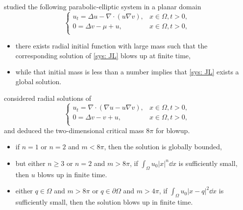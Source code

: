 \begin{frame}
 studied the following parabolic-elliptic system in a planar domain   
\begin{equation}\label{sys: JL}
\begin{cases}\tag{JL}
u_t = \Delta u - \nabla\cdot(u\nabla v), & x\in\Omega, t > 0,\\
0 = \Delta v - \mu + u, & x\in\Omega, t > 0,\\
\end{cases}
\end{equation}
\begin{itemize}
    \item there exists radial initial function with large mass such that the corresponding solution of \eqref{sys: JL} blows up at finite time, 
    \item while that initial mass is less than a number implies that \eqref{sys: JL} exists a global solution.
\end{itemize}
\end{frame}

\begin{frame}
       considered radial solutions of
 \begin{equation}
 \label{sys: nagai pe}
 \begin{cases}\tag{N}
 u_t = \nabla\cdot(\nabla u - u\nabla v), & x\in\Omega, t > 0,\\
 0 = \Delta v - v + u, & x\in\Omega, t > 0, \\
 \end{cases}
 \end{equation} 
 and deduced the two-dimensional critical mass $8\pi$ for blowup.
 \begin{itemize}
    \item if $n=1$ or $n=2$ and $m<8\pi$, then the solution is globally bounded, 
    \item but either $n\geq3$ or $n=2$ and $m>8\pi$, if $\int_\Omega u_0|x|^n\dd x$ is sufficiently small, then $u$ blows up in finite time.
    \item either $q\in\Omega$ and $m > 8\pi$ or $q\in\partial\Omega$ and $m > 4\pi$, if $\int_\Omega u_0|x-q|^2\dd x$ is sufficiently small, then the solution blows up in finite time. 
 \end{itemize}
\end{frame}


